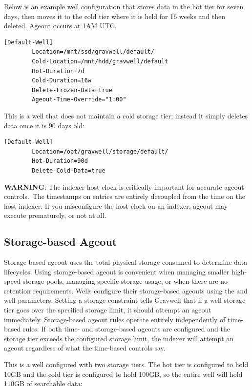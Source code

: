 {{Below is an example well configuration that stores data in the hot tier
for seven days, then moves it to the cold tier where it is held for 16
weeks and then deleted. Ageout occurs at 1AM UTC.

\begin{Verbatim}[breaklines=true]
[Default-Well]
        Location=/mnt/ssd/gravwell/default/
        Cold-Location=/mnt/hdd/gravwell/default
        Hot-Duration=7d
        Cold-Duration=16w
        Delete-Frozen-Data=true
        Ageout-Time-Override="1:00"
\end{Verbatim}

This is a well that does not maintain a cold storage tier; instead it simply
deletes data once it is 90 days old:

\begin{Verbatim}[breaklines=true]
[Default-Well]
        Location=/opt/gravwell/storage/default/
        Hot-Duration=90d
        Delete-Cold-Data=true
\end{Verbatim}

\textbf{WARNING}: The indexer host clock is critically important for accurate
ageout controls.~The timestamps on entries are entirely decoupled from
the time on the host indexer. If you misconfigure the host clock on an
indexer, ageout may execute prematurely, or not at all.

\subsection{Storage-based Ageout}

Storage-based ageout uses the total physical storage consumed to
determine data lifecycles. Using storage-based ageout is convenient
when managing smaller high-speed storage pools, managing specific
storage usage, or when there are no retention requirements. Wells
configure their storage-based ageouts using the
 and  well parameters.
Setting a storage constraint tells Gravwell that if a well storage tier
goes over the specified storage limit, it should attempt an ageout
immediately. Storage-based ageout rules operate entirely independently
of time-based rules. If both time- and storage-based ageouts are
configured and the storage tier exceeds the configured storage limit,
the indexer will attempt an ageout regardless of what the time-based
controls say.

This is a well configured with two storage tiers. The hot tier is
configured to hold 10GB and the cold tier is configured to hold 100GB,
so the entire well will hold 110GB of searchable data:

}}
